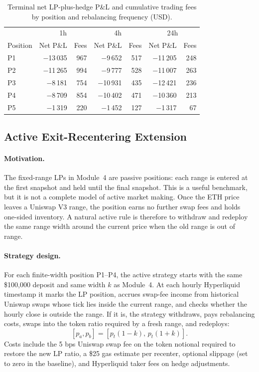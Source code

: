 \begin{table}[h]
\centering
\caption{Terminal net LP-plus-hedge P\&L and cumulative trading fees by position and
         rebalancing frequency (USD).}
\label{tab:module5-hedge}
\small
\begin{tabular}{lrrrrrr}
\hline
 & \multicolumn{2}{c}{1h} & \multicolumn{2}{c}{4h} & \multicolumn{2}{c}{24h} \\
Position & Net P\&L & Fees & Net P\&L & Fees & Net P\&L & Fees \\
\hline
P1 & $-$13\,035 & 967 & $-$9\,652 & 517 & $-$11\,205 & 248 \\
P2 & $-$11\,265 & 994 & $-$9\,777 & 528 & $-$11\,007 & 263 \\
P3 & $-$8\,181  & 754 & $-$10\,931 & 435 & $-$12\,421 & 236 \\
P4 & $-$8\,709  & 854 & $-$10\,402 & 471 & $-$10\,360 & 213 \\
P5 & $-$1\,319  & 220 & $-$1\,452  & 127 & $-$1\,317  &  67 \\
\hline
\end{tabular}
\end{table}

\subsection{Active Exit-Recentering Extension}
\label{sec:module5-active-recenter}

\paragraph{Motivation.}
The fixed-range LPs in Module~4 are passive positions: each range is entered at
the first snapshot and held until the final snapshot. This is a useful benchmark,
but it is not a complete model of active market making. Once the ETH price leaves
a Uniswap V3 range, the position earns no further swap fees and holds one-sided
inventory. A natural active rule is therefore to withdraw and redeploy the same
range width around the current price when the old range is out of range.

\paragraph{Strategy design.}
For each finite-width position P1--P4, the active strategy starts with the same
\$100{,}000 deposit and same width $k$ as Module~4. At each hourly Hyperliquid
timestamp it marks the LP position, accrues swap-fee income from historical
Uniswap swaps whose tick lies inside the current range, and checks whether the
hourly close is outside the range. If it is, the strategy withdraws, pays
rebalancing costs, swaps into the token ratio required by a fresh range, and
redeploys:
\[
[p_a,p_b]=[p_t(1-k),\,p_t(1+k)].
\]
Costs include the 5 bps Uniswap swap fee on the token notional required to
restore the new LP ratio, a \$25 gas estimate per recenter, optional slippage
(set to zero in the baseline), and Hyperliquid taker fees on hedge adjustments.

